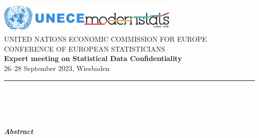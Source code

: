 
\setcounter{page}{1}
\thispagestyle{empty} \vspace*{-2.0cm} %
\includegraphics[height=1.5cm]{template/UNECE_logo}\hspace*{8cm}\includegraphics[height=1.5cm]{template/ModernStatsLogo}\\[\baselineskip]
\textsc{UNITED NATIONS ECONOMIC COMMISSION FOR EUROPE} \vspace*{2mm}\\
\textsc{CONFERENCE OF EUROPEAN STATISTICIANS}\vspace*{2mm}\\
\textbf{Expert meeting on Statistical Data Confidentiality}\vspace*{2mm}\\
26--28 September 2023, Wiesbaden              %
\vspace*{-1mm}
{\color{unece_color} \par\noindent\rule{\textwidth}{1.25pt}}\\[1cm]
{\LARGE \TITLE}\vspace*{-2mm}\\ %
\AUTHOR\ \\%
\EMAIL\vspace*{1cm}\\ %
\noindent
{\large\textbf{\textit{Abstract}}}\\ %
\ABSTRACT
\newpage

